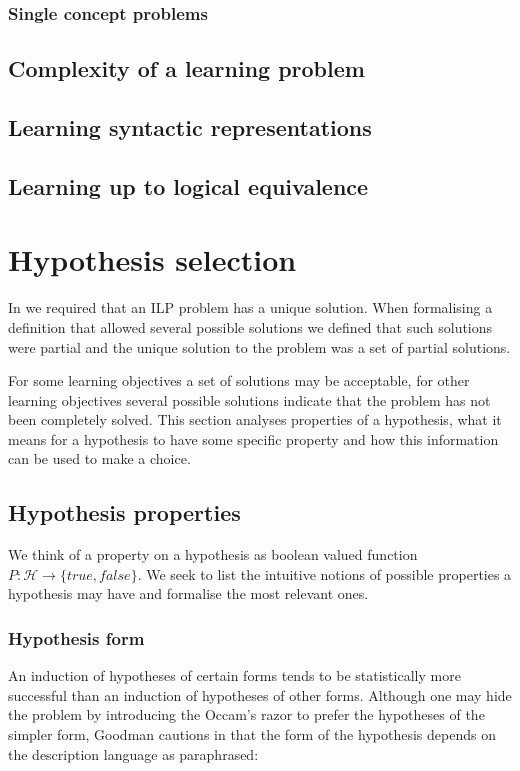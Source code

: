 \subsubsection{Single concept problems}


\subsection{Complexity of a learning problem}
\subsection{Learning syntactic representations}
\subsection{Learning up to logical equivalence}
\section{Hypothesis selection}
In  we required that an ILP problem has a unique solution. When formalising a definition that allowed several possible solutions we defined that such solutions were partial and the unique solution to the problem was a set of partial solutions.

For some learning objectives a set of solutions may be acceptable, for other learning objectives several possible solutions indicate that the problem has not been completely solved. This section analyses properties of a hypothesis, what it means for a hypothesis to have some specific property and how this information can be used to make a choice.

\subsection{Hypothesis properties}
We think of a property on a hypothesis as boolean valued function
$P:\mathcal{H} \to \{true, false\}$. We seek to list the intuitive notions of possible properties a hypothesis may have and formalise the most relevant ones.

\subsubsection{Hypothesis form}
An induction of hypotheses of certain forms tends to be statistically more successful than an induction of hypotheses of other forms.
Although one may hide the problem by introducing the Occam's razor to prefer the hypotheses of the simpler form, Goodman cautions in \cite{goodman1965new} that the form of the hypothesis depends on the description language as paraphrased:

